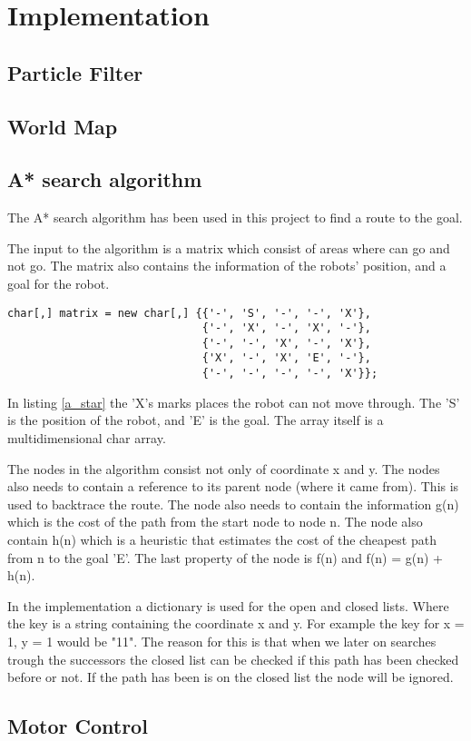 \chapter{Implementation}
\label{chp:impl}

\section{Particle Filter}
\section{World Map}
\section{A* search algorithm}

The A* search algorithm has been used in this project to find a route to the goal. 

The input to the algorithm is a matrix which consist of areas where  can go and not go. The matrix also contains the information of the robots' position, and a goal for the robot.

\begin{lstlisting}[caption={An example of the matrix which the A* uses as input.}, label=a_star]
char[,] matrix = new char[,] {{'-', 'S', '-', '-', 'X'},
							  {'-', 'X', '-', 'X', '-'},
							  {'-', '-', 'X', '-', 'X'},
							  {'X', '-', 'X', 'E', '-'},
							  {'-', '-', '-', '-', 'X'}};
\end{lstlisting}

In listing \ref{a_star} the 'X's marks places the robot can not move through. The 'S' is the position of the robot, and 'E' is the goal. The array itself is a multidimensional char array.

The nodes in the algorithm consist not only of coordinate x and y. The nodes also needs to contain a reference to its parent node (where it came from). This is used to backtrace the route. The node also needs to contain the information g(n) which is the cost of the path from the start node to node n. The node also contain h(n) which is a heuristic that estimates the cost of the cheapest path from n to the goal 'E'. The last property of the node is f(n) and f(n) = g(n) + h(n).

In the implementation a dictionary is used for the open and closed lists. Where the key is a string containing the coordinate x and y. For example the key for x = 1, y = 1 would be "11". The reason for this is that when we later on searches trough the successors the closed list can be checked if this path has been checked before or not. If the path has been is on the closed list the node will be ignored. 



\section{Motor Control}

